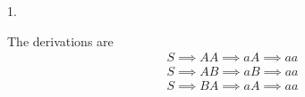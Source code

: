 





1. 

The derivations are
\begin{align*}
  S \implies AA \implies aA \implies aa \\
  S \implies AB \implies aB \implies aa \\
  S \implies BA \implies aA \implies aa \\
\end{align*}






